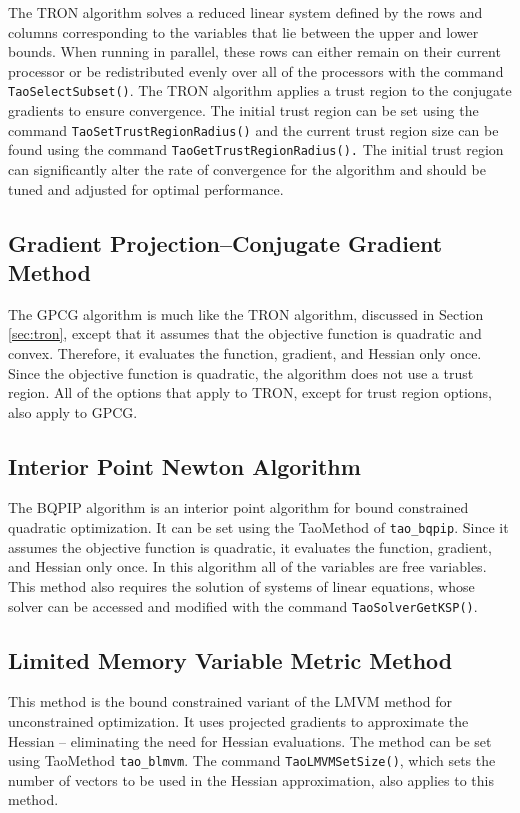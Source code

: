 The TRON algorithm solves a reduced linear system
defined by the rows and columns corresponding to the variables that
lie between the upper and lower bounds.
When running in parallel, these rows can either remain on
their current processor or be redistributed evenly over all of the
processors with the command {\tt TaoSelectSubset()}.
The TRON algorithm applies a trust region to the 
conjugate gradients to ensure convergence.  The initial trust region
can be set using the command 
{\tt TaoSetTrustRegionRadius()}
and the current trust region size can be found using the command
{\tt TaoGetTrustRegionRadius().}
The initial trust region can significantly alter the 
rate of convergence for the algorithm and should be
tuned and adjusted for optimal performance.


\subsection{Gradient Projection--Conjugate Gradient Method}
The GPCG \cite{more-toraldo} algorithm is much like the TRON algorithm, discussed in
Section \ref{sec:tron}, except that
it assumes that the objective function is quadratic and convex.
Therefore, it evaluates the function, gradient, and Hessian only
once.
Since the objective function
is quadratic, the algorithm does not use a trust region.  
All of the options that apply to TRON, except for trust region
options,  also apply to GPCG.

\subsection{Interior Point Newton Algorithm}
The BQPIP algorithm is an interior point algorithm for bound
constrained quadratic optimization.  It can be set using the
TaoMethod of {\tt tao\_bqpip}.
Since it assumes the objective function is quadratic, 
it evaluates the function, gradient, and Hessian only once.
In this algorithm all of the variables are free variables.
This method also requires the solution of systems of linear equations,
whose solver can be accessed and modified 
with the command {\tt TaoSolverGetKSP()}.

\subsection{Limited Memory Variable Metric Method}

This method is the bound constrained variant of the LMVM method for
unconstrained optimization.  It uses projected gradients to approximate
the Hessian -- eliminating the need for Hessian evaluations.
The method can be set using  TaoMethod {\tt tao\_blmvm}.
The command {\tt TaoLMVMSetSize()}, which sets the number
of vectors to be used in the Hessian approximation, 
also applies to this method.

